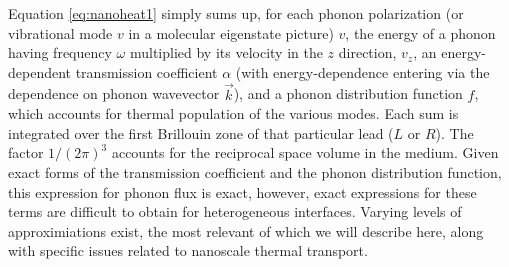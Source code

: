 Equation \ref{eq:nanoheat1} simply sums up, for each phonon polarization (or vibrational mode $v$ in a molecular eigenstate picture) $v$, the energy of a phonon having frequency $\omega$ multiplied by its velocity in the $z$ direction, $v_z$, an energy-dependent transmission coefficient $\alpha$ (with energy-dependence entering via the dependence on phonon wavevector $\vec{k}$), and a phonon distribution function $f$, which accounts for thermal population of the various modes. Each sum is integrated over the first Brillouin zone of that particular lead ($L$ or $R$). The factor $1/\left(2\pi\right)^3$ accounts for the reciprocal space volume in the medium.  Given exact forms of the transmission coefficient and the phonon distribution function, this expression for phonon flux is exact, however, exact expressions for these terms are difficult to obtain for heterogeneous interfaces. Varying levels of approximiations exist, the most relevant of which we will describe here, along with specific issues related to nanoscale thermal transport.\par

